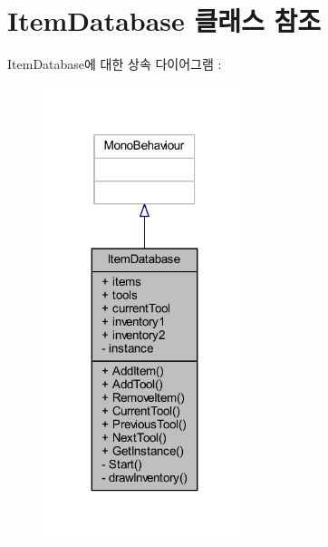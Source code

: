 \hypertarget{class_item_database}{}\section{Item\+Database 클래스 참조}
\label{class_item_database}


Item\+Database에 대한 상속 다이어그램 \+: \nopagebreak
\begin{figure}[H]
\begin{center}
\leavevmode
\includegraphics[width=167pt]{d7/d58/class_item_database__inherit__graph}
\end{center}
\end{figure}


